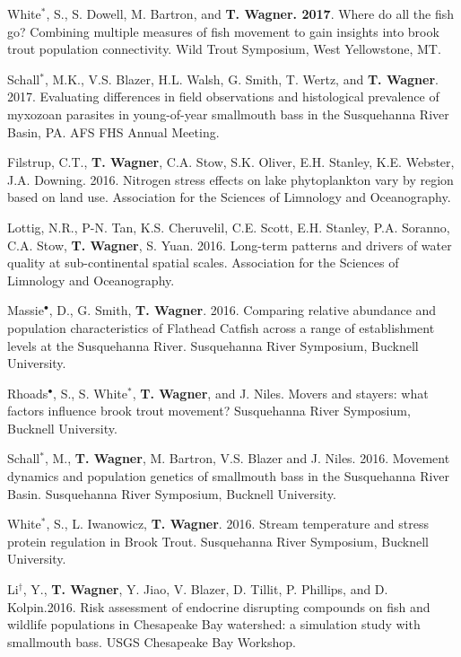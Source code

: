 \documentclass[10pt]{article}
\begin{document}
\begin{flushleft}
\begin{etaremune}
\item White$^*$, S., S. Dowell, M. Bartron, and {\bf T. Wagner. 2017}. Where do all the fish go? Combining multiple measures of fish movement to gain insights into brook trout population connectivity. Wild Trout Symposium, West Yellowstone, MT.

\item Schall$^*$, M.K., V.S. Blazer, H.L. Walsh, G. Smith, T. Wertz, and {\bf T. Wagner}. 2017. Evaluating differences in field observations and histological prevalence of myxozoan parasites in young-of-year smallmouth bass in the Susquehanna River Basin, PA. AFS FHS Annual Meeting.

\item Filstrup, C.T.,  {\bf T. Wagner}, C.A. Stow, S.K. Oliver, E.H. Stanley, K.E. Webster, J.A. Downing. 2016. Nitrogen stress effects on lake phytoplankton vary by region based on land use. Association for the Sciences of Limnology and Oceanography. 

\item Lottig, N.R., P-N. Tan, K.S. Cheruvelil, C.E. Scott, E.H. Stanley, P.A. Soranno, C.A. Stow, {\bf T. Wagner}, S. Yuan. 2016. Long-term patterns and drivers of water quality at sub-continental spatial scales. Association for the Sciences of Limnology and Oceanography. 

\item Massie$^\bullet$, D., G. Smith, {\bf T. Wagner}. 2016. Comparing relative abundance and population characteristics of Flathead Catfish across a range of establishment levels at the Susquehanna River. Susquehanna River Symposium, Bucknell University. 

\item Rhoads$^\bullet$, S., S. White$^*$, {\bf T. Wagner}, and J. Niles. Movers and stayers: what factors influence brook trout movement? Susquehanna River Symposium, Bucknell University.

\item Schall$^*$, M., {\bf T. Wagner}, M. Bartron, V.S. Blazer and J. Niles. 2016. Movement dynamics and population genetics of smallmouth bass in the Susquehanna River Basin. Susquehanna River Symposium, Bucknell University.

\item White$^*$, S., L. Iwanowicz, {\bf T. Wagner}. 2016. Stream temperature and stress protein regulation in Brook Trout. Susquehanna River Symposium, Bucknell University. 

\item Li$^\dagger$, Y.,  {\bf T. Wagner}, Y. Jiao, V. Blazer, D. Tillit, P. Phillips, and D. Kolpin.2016. Risk assessment of endocrine disrupting compounds on fish and wildlife populations in Chesapeake Bay watershed: a simulation study with smallmouth bass. USGS Chesapeake Bay Workshop.


\end{etaremune}
\end{flushleft}
\end{document}
